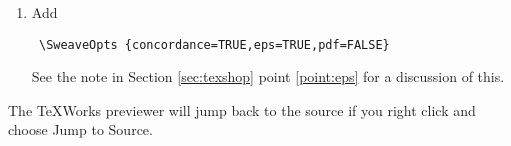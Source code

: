 \documentclass[12pt]{ujarticle}
\begin{document}
\begin{enumerate}
\item Add 
\begin{verbatim}
 \SweaveOpts {concordance=TRUE,eps=TRUE,pdf=FALSE}
\end{verbatim}
See the note in Section \ref{sec:texshop} point \ref{point:eps} for a discussion of this.
\end{enumerate}

The TeXWorks previewer will jump back to the source if you right click and choose Jump to Source.


\end{document}
